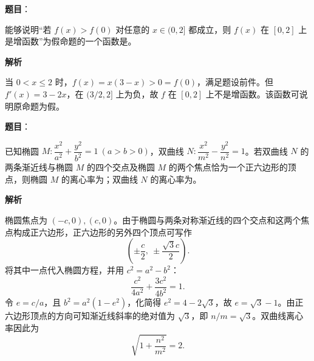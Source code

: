 \begin{answer}

\textbf{题目}：

能够说明“若 $f(x)>f(0)$ 对任意的 $x\in(0,2]$ 都成立，则 $f(x)$ 在 $[0,2]$ 上是增函数”为假命题的一个函数是\gkblank{}。

\textbf{解析}

当 $0<x\leqslant2$ 时，$f(x)=x(3-x)>0=f(0)$，满足题设前件。但 $f'(x)=3-2x$，在 $(3/2,2]$ 上为负，故 $f$ 在 $[0,2]$ 上不是增函数。该函数可说明原命题为假。


\end{answer}
\begin{answer}

\textbf{题目}：

已知椭圆 $M:\dfrac{x^2}{a^2}+\dfrac{y^2}{b^2}=1\ (a>b>0)$，双曲线 $N:\dfrac{x^2}{m^2}-\dfrac{y^2}{n^2}=1$。若双曲线 $N$ 的两条渐近线与椭圆 $M$ 的四个交点及椭圆 $M$ 的两个焦点恰为一个正六边形的顶点，则椭圆 $M$ 的离心率为\gkblank{}；双曲线 $N$ 的离心率为\gkblank{}。

\textbf{解析}

椭圆焦点为 $(-c,0),(c,0)$。由于椭圆与两条对称渐近线的四个交点和这两个焦点构成正六边形，正六边形的另外四个顶点可写作
\nopagebreak[4]
\[
\left(\pm\frac c2,\ \pm\frac{\sqrt3c}{2}\right).
\]
将其中一点代入椭圆方程，并用 $c^2=a^2-b^2$：
\nopagebreak[4]
\[
\frac{c^2}{4a^2}+\frac{3c^2}{4b^2}=1.
\]
令 $e=c/a$，且 $b^2=a^2(1-e^2)$，化简得 $e^2=4-2\sqrt3$，故 $e=\sqrt3-1$。由正六边形顶点的方向可知渐近线斜率的绝对值为 $\sqrt3$，即 $n/m=\sqrt3$。双曲线离心率因此为
\nopagebreak[4]
\[
\sqrt{1+\frac{n^2}{m^2}}=2.
\]


\end{answer}

